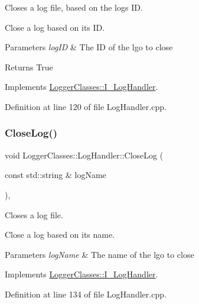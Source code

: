 Closes a log file, based on the logs ID. 

Close a log based on its ID.


\begin{DoxyParams}{Parameters}
{\em log\+ID} & The ID of the lgo to close \\
\hline
\end{DoxyParams}
\begin{DoxyReturn}{Returns}
True 
\end{DoxyReturn}


Implements \mbox{\hyperlink{classLoggerClasses_1_1I__LogHandler_a658c99568d629e22f4c8b69f03c1a96c}{Logger\+Classes\+::\+I\+\_\+\+Log\+Handler}}.



Definition at line 120 of file Log\+Handler.\+cpp.

\mbox{\label{classLoggerClasses_1_1LogHandler_aa05e0b9ca6afa0ca634ba4404ca29d3d}} 
\subsubsection{\texorpdfstring{CloseLog()}{CloseLog()}\hspace{0.1cm}{\footnotesize\ttfamily [2/2]}}
{\footnotesize\ttfamily void Logger\+Classes\+::\+Log\+Handler\+::\+Close\+Log (\begin{DoxyParamCaption}\item[{const std\+::string \&}]{log\+Name }\end{DoxyParamCaption})\hspace{0.3cm}{\ttfamily [override]}, {\ttfamily [virtual]}}



Closes a log file. 

Close a log based on its name.


\begin{DoxyParams}{Parameters}
{\em log\+Name} & The name of the lgo to close \\
\hline
\end{DoxyParams}


Implements \mbox{\hyperlink{classLoggerClasses_1_1I__LogHandler_a2cba089bf717569c3bccea8ed6013c21}{Logger\+Classes\+::\+I\+\_\+\+Log\+Handler}}.



Definition at line 134 of file Log\+Handler.\+cpp.

